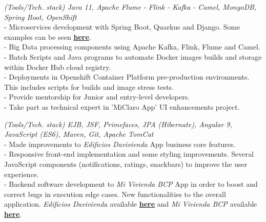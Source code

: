 \documentclass[]{CV-JuanCamiloFlorez}
\begin{document}
\begin{minipage}[t]{0.66\textwidth}
    \textit{(Tools/Tech. stack) Java 11, Apache Flume - Flink - Kafka - Camel, MongoDB, Spring Boot, OpenShift} \\
        - Microservices development with Spring Boot, Quarkus and Django. Some examples can be seen \textbf{\href{https://github.com/VanJFlorez/flink-kafka-fraud-detection}{here}}. \\
        - Big Data processing components using Apache Kafka, Flink, Flume and Camel. \\
        - Batch Scripts and Java programs to automate Docker images builds and storage within Docker Hub cloud registry. \\
        - Deployments in Openshift Container Platform pre-production environments. This includes scripts for builds and image stress tests. \\
        - Provide mentorship for Junior and entry-level developers. \\
        - Take part as technical expert in 'MiClaro App' UI enhancements project. \\
        \sectionsep

    \textit{(Tools/Tech. stack) EJB, JSF, Primefaces, JPA (Hibernate), Angular 9, JavaScript (ES6), Maven, Git, Apache TomCat} \\
        - Made improvements to \textit{Edificios Davivienda} App business core features. \\
        - Responsive front-end implementation and some styling improvements. Several JavaScript components (notifications, ratings, snackbars) to improve the user experience. \\
        - Backend software development to \textit{Mi Vivienda BCP} App in order to boost and correct bugs in execution edge cases. New functionalities to the overall application. \textit{Edificios Davivienda} available \textbf{\href{https://www.edificiosdavivienda.com}{here}} and \textit{Mi Vivienda BCP} available \textbf{\href{https://www.miviviendabcp.com.bo}{here}}. \\
        \sectionsep


\end{minipage}
\end{document}
